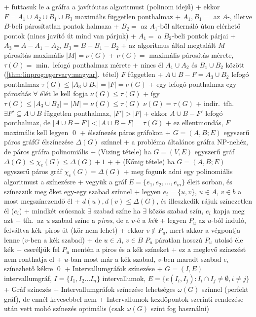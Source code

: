   + futtasuk le a gráfra a javítóutas algoritmust (polinom idejű)
  + \stmnt ekkor $F = A_1 \cup A_2 \cup B_1 \cup B_3$ maximális
    független ponthalmaz
    + $A_1, B_1 =$ az $A$-, illetve $B$-beli párosítatlan pontok
      halmaza
    + $B_2 =$ az $A_1$-ből alternáló úton elérhető pontok (nincs
      javító út \RA mind van párjuk)
    + $A_1 =$ a $B_2$-beli pontok párjai
    + $A_3 = A - A_1 - A_2$, $B_3 = B - B_1 - B_2$
    + \proof az algoritmus által megtalált $M$ párosítás maximális \RA%
      $\lvert M \rvert = \nu(G)$
      + $\nu(G) =$ maximális párosítás mérete, $\tau(G) =$ min.~lefogó
        ponthalmaz mérete
      + nincs él $A_1 \cup A_2$ és $B_1 \cup B_2$ között
        (\ref{thm:linprog:egervary:magyar}.~tétel) \RA $F$ független
      + $A \cup B - F = A_3 \cup B_2$ lefogó ponthalmaz \RA $\tau(G)
        \le \lvert A_3 \cup B_2 \rvert = \lvert F \rvert = \nu(G)$
      + egy lefogó ponthalmaz egy párosítás $\forall$ élét le kell
        fogja \RA $\nu(G) \le \tau(G)$
      + így $\tau(G) \le \lvert A_3 \cup B_2 \rvert = \lvert M \rvert
        = \nu(G) \le \tau(G)$ \RA $\nu(G) = \tau(G)$
    + indir.~tfh.~$\exists F' \subseteq A \cup B$ független
      ponthalmaz, $\lvert F' \rvert > \lvert F \rvert$
      + ekkor $A \cup B - F'$ lefogó ponthalmaz, de $\lvert A \cup B -
        F' \rvert < \lvert A \cup B - F \rvert = \tau(G)$
      + ez ellentmondás, $F$ maximális kell legyen \qed
+ \prob élszínezés páros gráfokon
  + \DataIn $G = (A, B; E)$ egyszerű páros gráf\qquad\DataOut $G$ élszínezése
    $\Delta(G)$ színnel
  + a probléma általános gráfra NP-nehéz, de páros gráfra polinomiális
  + \thm \label{thm:kozelito:additiv:vizing}(Vizing tétele) ha $G = (V, E)$ egyszerű gráf \RA $\Delta(G)
    \le \chi_e(G) \le \Delta(G) + 1$
    + \noproof
  + \thm (Kőnig tétele) ha $G = (A, B; E)$ egyszerű páros gráf \RA%
    $\chi_e(G) = \Delta(G)$
    + \proof meg fogunk adni egy polinomiális algoritmust a színezésre
  + vegyük a gráf $E = \{ e_1, e_2, \ldots, e_m \}$ éleit sorban, és
    színezzük meg őket egy-egy szabad színnel
    + legyen $e_i = \{u, v\}$, $ u \in A$, $v \in b$ a most
      megszínezendő él
    + $d(u), d(v) \le \Delta(G)$, és illeszkedik rájuk színezetlen él
      ($e_i$)
      + \RA mindkét csúcsnak $\exists$ szabad színe \RA ha $\exists$
      közös szabad szín, $e_i$ kapja meg azt
  + tfh.~az $u$ szabad színe a \emph{piros}, de a $v$-é a \emph{kék}
    + legyen $P_u$ az $u$-ból induló, felváltva kék--piros út (kör nem
      lehet)
    + ekkor $v \notin P_u$, mert akkor a végpontja lenne ($v$-ben a
      kék szabad)
      + de $u \in A$, $v \in B$ \RA $P_u$ páratlan hosszú \RA $P_u$
        utolsó éle kék
    + cseréljük fel $P_u$ mentén a piros és a kék színeket
      + ez a meglevő színezést nem ronthatja el
      + $u$-ban most már a kék szabad, $v$-ben maradt szabad \RA%
        $e_i$ színezhető kékre \qed
+ \prob Intervallumgráfok színezése
  + \DataIn $G= (I, E)$ intervallumgráf, $I = \{I_1,I_2 \dots I_n\}$ intervallumok,
  $E = \{e(I_i,I_j): I_i \cap I_j\ne \emptyset, i\ne j \}$
  + \DataOut Gráf színezés
  + Intervallumgráfok színezése lehetséges $\omega(G)$ színnel (perfekt gráf),
  de ennél kevesebbel nem
  + Intervallumok kezdőpontok szerinti rendezése után vett mohó színezés 
  optimális (csak $\omega(G)$ színt fog használni)
        

